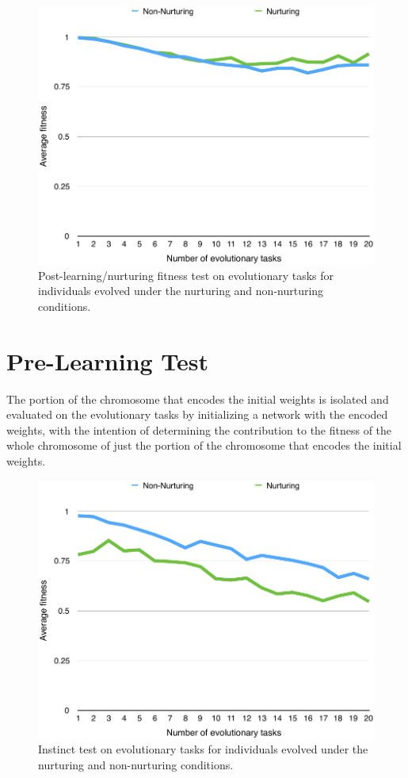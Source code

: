 \documentclass[master]{outhesis}
\begin{document}
\begin{figure}[H]
	\centering
	\includegraphics{NurturingFitnessTestPlot.pdf}
	\caption{Post-learning/nurturing fitness test on evolutionary tasks for individuals evolved under the nurturing and non-nurturing conditions.}
\end{figure}

\section{Pre-Learning Test}

The portion of the chromosome that encodes the initial weights is isolated and evaluated on the evolutionary tasks by initializing a network with the encoded weights, with the intention of determining the contribution to the fitness of the whole chromosome of just the portion of the chromosome that encodes the initial weights.

\begin{figure}[H]
	\centering
	\includegraphics{NetworkTestPlot.pdf}
	\caption{Instinct test on evolutionary tasks for individuals evolved under the nurturing and non-nurturing conditions.}
\end{figure}
\end{document}
